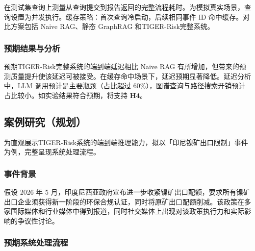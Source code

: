 \documentclass[12pt,a4paper]{article}
\newcommand{\projectshort}{TIGER-Risk}
\begin{document}
在测试集查询上测量从查询提交到报告返回的完整流程耗时。为模拟真实场景，查询设置为并发执行。缓存策略：首次查询冷启动，后续相同事件 ID 命中缓存。对比方案包括 Naive RAG、静态 GraphRAG 和\projectshort 完整系统。

\subsubsection{预期结果与分析}

预期\projectshort 完整系统的端到端延迟相比 Naive RAG 有所增加，但带来的预测质量提升使该延迟可被接受。在缓存命中场景下，延迟预期显著降低。延迟分析中，LLM 调用预计是主要瓶颈（占比超过 60\%），图谱查询与路径搜索开销预计占比较小。如实验结果符合预期，将支持 \textbf{H4}。

\subsection{案例研究（规划）}
\label{sec:exp-casestudy}

为直观展示\projectshort 系统的端到端推理能力，拟以「印尼镍矿出口限制」事件为例，完整呈现系统处理流程。

\subsubsection{事件背景}

假设 2026 年 5 月，印度尼西亚政府宣布进一步收紧镍矿出口配额，要求所有镍矿出口企业须获得新一阶段的环保合规认证，同时将原矿出口配额削减。该政策在多家国际媒体和行业媒体中得到报道，同时社交媒体上出现对该政策执行力和实际影响的争议性讨论。

\subsubsection{预期系统处理流程}
\end{document}
